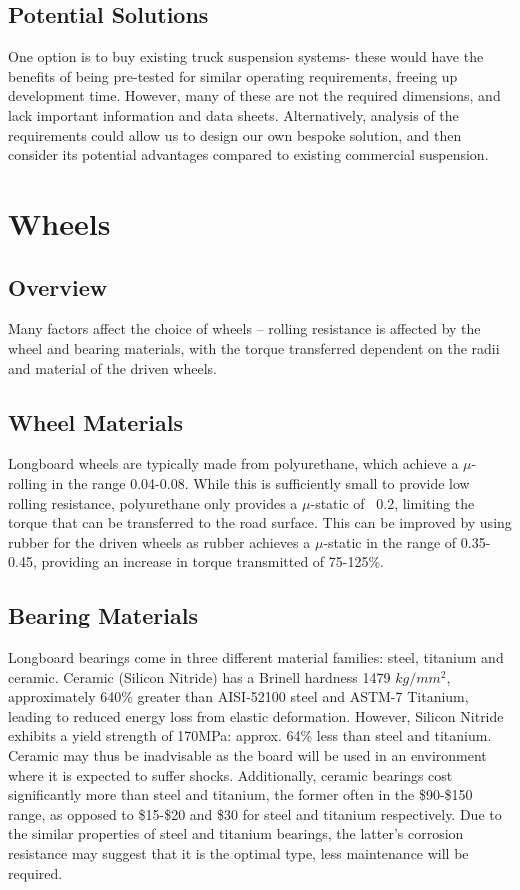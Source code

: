\documentclass[journal,10pt]{IEEEtran}
\begin{document}
    \subsection{Potential Solutions}
        One option is to buy existing truck suspension systems- these would have the benefits of being pre-tested for similar operating requirements, freeing up development time. However, many of these are not the required dimensions, and lack important information and data sheets. Alternatively, analysis of the requirements could allow us to design our own bespoke solution, and then consider its potential advantages compared to existing commercial suspension. 
\section{Wheels}
    \subsection{Overview}
        Many factors affect the choice of wheels – rolling resistance is affected by the wheel and bearing materials, with the torque transferred dependent on the radii and material of the driven wheels.
    \subsection{Wheel Materials}
        Longboard wheels are typically made from polyurethane, which achieve a $\mu$-rolling in the range 0.04-0.08. While this is sufficiently small to provide low rolling resistance, polyurethane only provides a $\mu$-static of ~0.2, limiting the torque that can be transferred to the road surface. This can be improved by using rubber for the driven wheels as rubber achieves a $\mu$-static in the range of 0.35-0.45, providing an increase in torque transmitted of 75-125\%.
    \subsection{Bearing Materials}
        Longboard bearings come in three different material families: steel, titanium and ceramic. Ceramic (Silicon Nitride) has a Brinell hardness 1479 $kg/mm^{2}$, approximately 640\% greater than AISI-52100 steel and ASTM-7 Titanium, leading to reduced energy loss from elastic deformation. However, Silicon Nitride exhibits a yield strength of 170MPa: approx. 64\% less than steel and titanium. Ceramic may thus be inadvisable as the board will be used in an environment where it is expected to suffer shocks. Additionally, ceramic bearings cost significantly more than steel and titanium, the former often in the \$90-\$150 range, as opposed to \$15-\$20 and \$30 for steel and titanium respectively. Due to the similar properties of steel and titanium bearings, the latter’s corrosion resistance may suggest that it is the optimal type, less maintenance will be required. 
\end{document}
